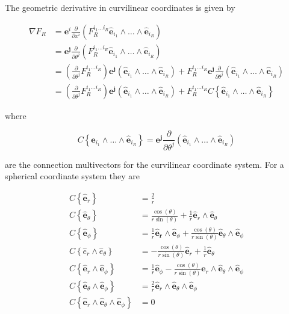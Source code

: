 \documentclass[10pt]{article}
\newcommand{\bfrac}[2]{\displaystyle\frac{#1}{#2}}
\newcommand{\lp}{\left (}
\newcommand{\rp}{\right )}
\newcommand{\pdiff}[2]{\bfrac{\partial {#1}}{\partial {#2}}}
\newcommand{\lbrc}{\left \{}
\newcommand{\rbrc}{\right \}}
\newcommand{\W}{\wedge}
\begin{document}
The geometric derivative in curvilinear coordinates is given by

  \begin{align}
    \nabla F_{R} & =  \bm{e}^{i}\pdiff{}{x^{i}}\lp F_{R}^{i_{1}\dots i_{R}}
                     \bm{\hat{e}}_{i_{1}}\W\dots\W\bm{\hat{e}}_{i_{R}}\rp  \\
                   & =  \bm{e^{j}}\pdiff{}{\theta^{j}}\lp F_{R}^{i_{1}\dots i_{R}}
                     \bm{\hat{e}}_{i_{1}}\W\dots\W\bm{\hat{e}}_{i_{R}}\rp  \\
                   & =   \lp\pdiff{}{\theta^{j}} F_{R}^{i_{1}\dots i_{R}}\rp
                     \bm{e^{j}}\lp\bm{\hat{e}}_{i_{1}}\W\dots\W\bm{\hat{e}}_{i_{R}}\rp+
                     F_{R}^{i_{1}\dots i_{R}}\bm{e^{j}}
                     \pdiff{}{\theta^{j}}\lp\bm{\hat{e}}_{i_{1}}\W\dots\W\bm{\hat{e}}_{i_{R}}\rp \\
                   & =   \lp\pdiff{}{\theta^{j}} F_{R}^{i_{1}\dots i_{R}}\rp
                     \bm{e^{j}}\lp\bm{\hat{e}}_{i_{1}}\W\dots\W\bm{\hat{e}}_{i_{R}}\rp+
                     F_{R}^{i_{1}\dots i_{R}}C\lbrc \bm{\hat{e}}_{i_{1}}\W\dots\W\bm{\hat{e}}_{i_{R}}\rbrc
  \end{align}

where

  \begin{equation}
  C\lbrc \bm{\hat{e}}_{i_{1}}\W\dots\W\bm{\hat{e}}_{i_{R}}\rbrc  = \bm{e^{j}}\pdiff{}{\theta^{j}}
                                                              \lp\bm{\hat{e}}_{i_{1}}\W\dots\W\bm{\hat{e}}_{i_{R}}\rp
  \end{equation}

are the connection multivectors for the curvilinear coordinate system. For a
spherical coordinate system they are

  \begin{align}
  C\lbrc\bm{\hat{e}}_{r}\rbrc &=  \frac{2}{r} \\
  C\lbrc\bm{\hat{e}}_{\theta}\rbrc &=  \frac{\cos\left({\theta}\right)}{r \sin\left({\theta}\right)}
                                +\frac{1}{r}\bm{\hat{e}}_{r}\W\bm{\hat{e}}_{\theta} \\
  C\lbrc\bm{\hat{e}}_{\phi}\rbrc &= \frac{1}{r}{\bm{\bm{\hat{e}}_{r}}}\W\bm{\hat{e}}_{{\phi}}+ \frac{\cos\left({\theta}\right)}{r \sin\left({\theta}\right)}\bm{\hat{e}}_{{\theta}}\W\bm{\hat{e}}_{{\phi}} \\
  C\lbrc\hat{e}_{r}\W\hat{e}_{\theta}\rbrc &=  - \frac{\cos\left({\theta}\right)}{r \sin\left({\theta}\right)}
                                        \bm{\hat{e}}_{r}+\frac{1}{r}\bm{\hat{e}}_{{\theta}} \\
  C\lbrc\bm{\hat{e}}_{r}\W\bm{\hat{e}}_{\phi}\rbrc &= \frac{1}{r}\bm{\hat{e}}_{{\phi}}
                      - \frac{\cos\left({\theta}\right)}{r \sin\left({\theta}\right)}\bm{\hat{e}}_{r}\W\bm{\hat{e}}_{{\theta}}\W\bm{\hat{e}}_{{\phi}} \\
  C\lbrc\bm{\hat{e}}_{\theta}\W\bm{\hat{e}}_{\phi}\rbrc &=  \frac{2}{r}\bm{\hat{e}}_{r}\W
                                                \bm{\hat{e}}_{\theta}\W\bm{\hat{e}}_{\phi} \\
  C\lbrc\bm{\hat{e}}_r\W\bm{\hat{e}}_{\theta}\W\bm{\hat{e}}_{\phi}\rbrc &= 0
  \end{align}
\end{document}
